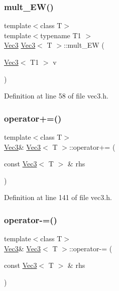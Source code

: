 \subsubsection{\texorpdfstring{mult\_EW()}{mult\_EW()}\hspace{0.1cm}{\footnotesize\ttfamily [2/2]}}
{\footnotesize\ttfamily template$<$class T$>$ \\
template$<$typename T1 $>$ \\
\mbox{\hyperlink{class_vec3}{Vec3}} \mbox{\hyperlink{class_vec3}{Vec3}}$<$ T $>$\+::mult\+\_\+\+EW (\begin{DoxyParamCaption}\item[{\mbox{\hyperlink{class_vec3}{Vec3}}$<$ T1 $>$}]{v }\end{DoxyParamCaption})\hspace{0.3cm}{\ttfamily [inline]}}



Definition at line 58 of file vec3.\+h.

\mbox{\label{class_vec3_a8501af04a24777f846b3ddcda6bf0705}} 
\subsubsection{\texorpdfstring{operator+=()}{operator+=()}}
{\footnotesize\ttfamily template$<$class T$>$ \\
\mbox{\hyperlink{class_vec3}{Vec3}}\& \mbox{\hyperlink{class_vec3}{Vec3}}$<$ T $>$\+::operator+= (\begin{DoxyParamCaption}\item[{const \mbox{\hyperlink{class_vec3}{Vec3}}$<$ T $>$ \&}]{rhs }\end{DoxyParamCaption})\hspace{0.3cm}{\ttfamily [inline]}}



Definition at line 141 of file vec3.\+h.

\mbox{\label{class_vec3_ae9cb727000423d7def58bfba67f39099}} 
\subsubsection{\texorpdfstring{operator-\/=()}{operator-=()}}
{\footnotesize\ttfamily template$<$class T$>$ \\
\mbox{\hyperlink{class_vec3}{Vec3}}\& \mbox{\hyperlink{class_vec3}{Vec3}}$<$ T $>$\+::operator-\/= (\begin{DoxyParamCaption}\item[{const \mbox{\hyperlink{class_vec3}{Vec3}}$<$ T $>$ \&}]{rhs }\end{DoxyParamCaption})\hspace{0.3cm}{\ttfamily [inline]}}



